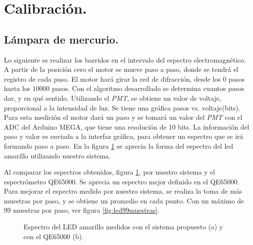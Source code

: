 \section{Calibración.}
\subsection{Lámpara de mercurio.}
Lo siguiente es realizar los barridos en el intervalo del espectro electromagnético. A partir de la posición cero el motor se mueve paso a paso, donde se tendrá el registro de cada paso. El motor hará girar la red de difracción, desde los 0 pasos hasta los 10000 pasos. Con el algoritmo desarrollado se determina cuantos pasos dar, y en qué sentido. Utilizando el \textit{PMT}, se obtiene un valor de voltaje, proporcional a la intensidad de luz. Se tiene una gráfica pasos vs. voltaje(bits). 
Para esta medición el motor dará un paso y se tomará un valor del \textit{PMT} con el ADC del Arduino MEGA, que tiene una resolución de 10 bits. La información del paso y valor es enviada a la interfaz gráfica, para obtener un espectro que se irá formando paso a paso. En la figura \ref{fig:ledqe65} se aprecia la forma del espectro del led amarillo utilizando nuestro sistema. 


Al comparar los espectros obtenidos, figura \ref{fig:ledqe65}, por nuestro sistema y el espectrómetro QE65000. Se aprecia un espectro mejor definido en el QE65000. Para mejorar el espectro medido por nuestro sistema, se realiza la toma de más muestras por paso, y se obtiene un promedio en cada punto. Con un máximo de 99 muestras por paso, ver figura \ref{fig:led99muestras}.
\begin{figure}[h]
	\centering
	\caption{Espectro del LED amarillo medidos con el sistema propuesto (a) y con el QE65000 (b).}
	\label{fig:ledqe65}
\end{figure}

